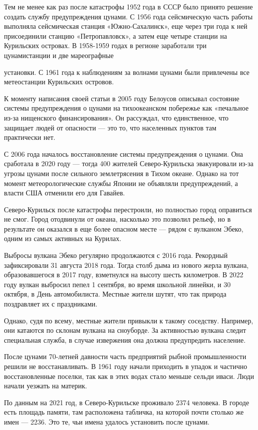 Тем не менее как раз после катастрофы 1952 года в СССР было принято решение создать службу предупреждения цунами. С 1956 года сейсмическую часть работы выполняла сейсмическая станция «Южно-Сахалинск», еще через три года к ней присоединили станцию «Петропавловск», а затем еще четыре станции на Курильских островах. В 1958-1959 годах в регионе заработали три цунамистанции и две мареографные

установки. С 1961 года к наблюдениям за волнами цунами были привлечены все метеостанции Курильских островов.

К моменту написания своей статьи в 2005 году Белоусов описывал состояние системы предупреждения о цунами на тихоокеанском побережье как «печальное из-за нищенского финансирования». Он рассуждал, что единственное, что защищает людей от опасности --- это то, что населенных пунктов там практически нет.

С 2006 года началось восстановление системы предупреждения о цунами. Она сработала в 2020 году --- тогда 400 жителей Северо-Курильска эвакуировали из-за угрозы цунами после сильного землетрясения в Тихом океане. Однако на тот момент метеорологические службы Японии не объявляли предупреждений, а власти США отменили его для Гавайев.

Северо-Курильск после катастрофы перестроили, но полностью город оправиться не смог. Город отодвинули от океана, насколько это позволил рельеф, но в результате он оказался в еще более опасном месте --- рядом с вулканом Эбеко, одним из самых активных на Курилах.

Выбросы вулкана Эбеко регулярно продолжаются с 2016 года. Рекордный зафиксировали 31 августа 2018 года. Тогда столб дыма из нового жерла вулкана, образовавшегося в 2017 году, взметнулся на высоту шесть километров. В 2022 году вулкан выбросил пепел 1 сентября, во время школьной линейки, и 30 октября, в День автомобилиста. Местные жители шутят, что так природа поздравляет их с праздниками.

Однако, судя по всему, местные жители привыкли к такому соседству. Например, они катаются по склонам вулкана на сноуборде. За активностью вулкана следит специальная служба, в случае извержения она должна предупредить население.

После цунами 70-летней давности часть предприятий рыбной промышленности решили не восстанавливать. В 1961 году начали приходить в упадок и частично восстановленные поселки, так как в этих водах стало меньше сельди иваси. Люди начали уезжать на материк.

По данным на 2021 год, в Северо-Курильске проживало 2374 человека. В городе есть площадь памяти, там расположена табличка, на которой почти столько же имен --- 2236. Это те, чьи имена удалось установить после цунами.